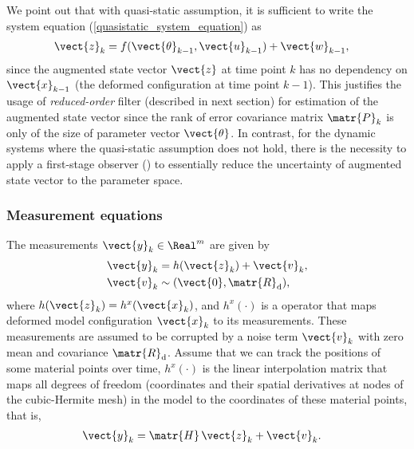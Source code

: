 \begin{rem}
\label{se-remark-quasitatic}
    We point out that with quasi-static assumption, it is sufficient to write the system equation (\ref{quasistatic_system_equation}) as
    \begin{align}
        \vect{z}_k &= f(\vect{\theta}_{k-1},\vect{u}_{k-1}) + \vect{w}_{k-1},
    \end{align}
    since the augmented state vector $\vect{z}$ at time point $k$ has no dependency on $\vect{x}_{k-1}$ (the deformed configuration at time point $k-1$). This justifies the usage of \emph{reduced-order} filter (described in next section) for estimation of the augmented state vector since the rank of error covariance matrix $\matr{P}_k$ is only of the size of parameter vector $\vect{\theta}$.
    In contrast, for the dynamic systems where the quasi-static assumption does not hold, there is the necessity to apply a first-stage observer (\citealt{Moireau2008Joint}) to essentially reduce the uncertainty of augmented state vector to the parameter space.
\end{rem}

\subsubsection*{Measurement equations}

The measurements $\vect{y}_k \in \Real^{m}$ are given by
\begin{align}
\vect{y}_k &= h(\vect{z}_k)  + \vect{v}_k , \label{eq-measurement}\\
\vect{v}_k &\sim (\vect{0},\matr{R}_\textnormal{d}) , \label{eq-measurement02}
\end{align}
where $h(\vect{z}_k)=h^x(\vect{x}_k)$, and $h^x(\cdot)$ is a operator that maps deformed model configuration $\vect{x}_k$ to its measurements. These measurements are assumed to be corrupted by a noise term $\vect{v}_k$ with zero mean and covariance $\matr{R}_\textnormal{d}$. Assume that we can track the positions of some material points over time, $h^x(\cdot)$ is the linear interpolation matrix that maps all degrees of freedom (coordinates and their spatial derivatives at nodes of the cubic-Hermite mesh) in the model to the coordinates of these material points, that is,
\begin{align}
\vect{y}_k &= \matr{H} \, \vect{z}_k  + \vect{v}_k . \label{eq-measurement03}
\end{align}



